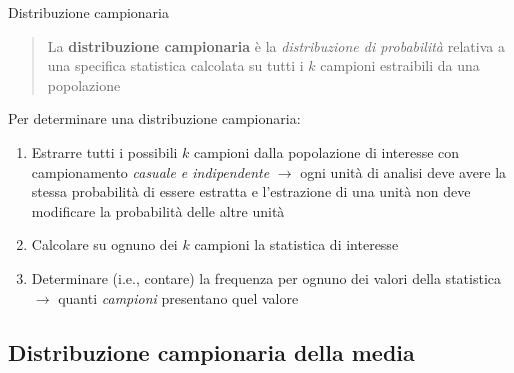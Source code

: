 \documentclass[
  ignorenonframetext,
  compress, aspectratio=149]{beamer}
\begin{document}
\begin{frame}{Distribuzione campionaria}
\label{distribuzione-campionaria}
\small

\begin{quote}
La \textbf{distribuzione campionaria} è la \emph{distribuzione di
probabilità} relativa a una specifica statistica calcolata su tutti i
\(k\) campioni estraibili da una popolazione
\end{quote}

Per determinare una distribuzione campionaria:

\begin{enumerate}
\item
  Estrarre tutti i possibili \(k\) campioni dalla popolazione di
  interesse con campionamento \emph{casuale e indipendente}
  \textcolor{evid}{$\rightarrow$} ogni unità di analisi deve avere la
  stessa probabilità di essere estratta e l'estrazione di una unità non
  deve modificare la probabilità delle altre unità
\item
  Calcolare su ognuno dei \(k\) campioni la statistica di interesse
\item
  Determinare (i.e., contare) la frequenza per ognuno dei valori della
  statistica \textcolor{evid}{$\rightarrow$} quanti \emph{campioni}
  presentano quel valore
\end{enumerate}
\end{frame}

\subsection{Distribuzione campionaria della
media}\label{distribuzione-campionaria-della-media}
\end{document}
